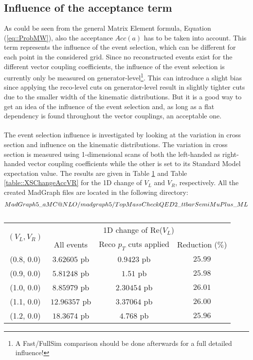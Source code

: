 \subsection{Influence of the acceptance term}
As could be seen from the general Matrix Element formula, Equation (\ref{eq::ProbMW}), also the acceptance $Acc(a)$ has to be taken into account. This term represents the influence of the event selection, which can be different for each point in the considered grid.
Since no reconstructed events exist for the different vector coupling coefficients, the influence of the event selection is currently only be measured on generator-level\footnote{A Fast/FullSim comparison should be done afterwards for a full detailed influence!}. This can introduce a slight bias since applying the reco-level cuts on generator-level result in slightly tighter cuts due to the smaller width of the kinematic distributions. But it is a good way to get an idea of the influence of the event selection and, as long as a flat dependency is found throughout the vector couplings, an acceptable one.\\
\\
The event selection influence is investigated by looking at the variation in cross section and influence on the kinematic distributions. The variation in cross section is measured using 1-dimensional scans of both the left-handed as right-handed vector coupling coefficients while the other is set to its Standard Model expectation value. The results are given in Table \ref{table::XSChangeAccVL} and Table \ref{table::XSChangeAccVR} for the 1D change of $V_L$ and $V_R$, respectively. All the created MadGraph files are located in the following directory:
\begin{eqnarray*}
  \scriptsize MadGraph5\_aMC@NLO/madgraph5/TopMassCheckQED2\_ttbarSemiMuPlus\_ML
\end{eqnarray*}

\begin{table}[h!]
 \centering
 \begin{tabular}{|c|c|c|c|}
  \hline
  \multirow{2}{*}{$(V_L,V_R)$} 	&  \multicolumn{3}{|c|}{1D change of Re($V_L$)}				\\
					&  All events	& Reco $p_T$ cuts applied	& Reduction ($\%$) 	\\
  \hline
    (0.8, 0.0) 				& $3.62605$ pb	& $0.9423$ pb			& $25.99$ 		\\
    (0.9, 0.0)				& $5.81248$ pb	& $1.51$ pb			& $25.98$		\\
    (1.0, 0.0)				& $8.85979$ pb	& $2.30454$ pb			& $26.01$ 		\\
    (1.1, 0.0)				& $12.96357$ pb	& $3.37064$ pb			& $26.00$ 		\\
    (1.2, 0.0)				& $18.3674$ pb	& $4.768$ pb			& $25.96$ 		\\
  \hline 
 \end{tabular} 
 \caption{} \label{table::XSChangeAccVL}
\end{table}

